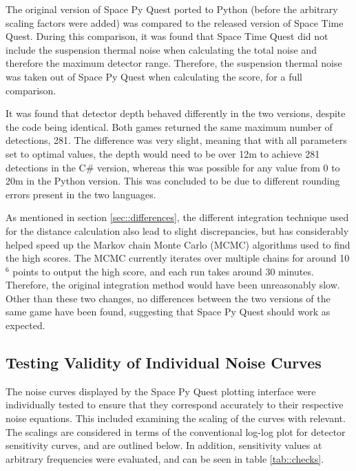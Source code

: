\documentclass{article}
\begin{document}
The original version of Space Py Quest ported to Python (before the
arbitrary scaling factors were added) was compared to the released
version of Space Time Quest. During this comparison, it was found that
Space Time Quest did not include the suspension thermal noise when
calculating the total noise and therefore the maximum detector
range. Therefore, the suspension thermal noise was taken out of
Space Py Quest when calculating the score, for a full comparison.

It was found that detector depth behaved differently in the two
versions, despite the code being identical. Both games returned the
same maximum number of detections, 281. The difference was very
slight, meaning that with all parameters set to optimal values, the
depth would need to be over 12m to achieve 281 detections in the C\#
version, whereas this was possible for any value from 0 to 20m in the
Python version. This was concluded to be due to different rounding
errors present in the two languages. 

As mentioned in section \ref{sec::differences}, the different
integration technique used for the distance calculation also lead to
slight discrepancies, but has considerably helped speed up the Markov
chain Monte Carlo (MCMC) algorithms used to find the high scores. The
MCMC currently iterates over multiple chains for around 10$^6$ points
to output the high score, and each run takes around 30
minutes. Therefore, the original integration method would have been
unreasonably slow. Other than these two changes, no differences
between the two versions of the same game have been found, suggesting
that Space Py Quest should work as expected.

\subsection{Testing Validity of Individual Noise Curves}
The noise curves displayed by the Space Py Quest plotting interface
were individually tested to ensure that they correspond accurately to
their respective noise equations. This included examining the scaling
of the curves with relevant. The scalings are considered in terms of
the conventional log-log plot for detector sensitivity curves, and are
outlined below. In addition, sensitivity values at arbitrary
frequencies were evaluated, and can be seen in table
\ref{tab::checks}.

\end{document}
